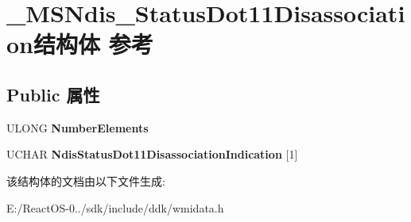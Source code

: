 \hypertarget{struct___m_s_ndis___status_dot11_disassociation}{}\section{\+\_\+\+M\+S\+Ndis\+\_\+\+Status\+Dot11\+Disassociation结构体 参考}
\label{struct___m_s_ndis___status_dot11_disassociation}
\subsection*{Public 属性}
\begin{DoxyCompactItemize}
\item 
\mbox{\label{struct___m_s_ndis___status_dot11_disassociation_a5f61a02389e13ae80916a744b9dee163}} 
U\+L\+O\+NG {\bfseries Number\+Elements}
\item 
\mbox{\label{struct___m_s_ndis___status_dot11_disassociation_af6919acc45313287beb7c5229bd4929a}} 
U\+C\+H\+AR {\bfseries Ndis\+Status\+Dot11\+Disassociation\+Indication} \mbox{[}1\mbox{]}
\end{DoxyCompactItemize}


该结构体的文档由以下文件生成\+:\begin{DoxyCompactItemize}
\item 
E\+:/\+React\+O\+S-\/0../sdk/include/ddk/wmidata.\+h\end{DoxyCompactItemize}
